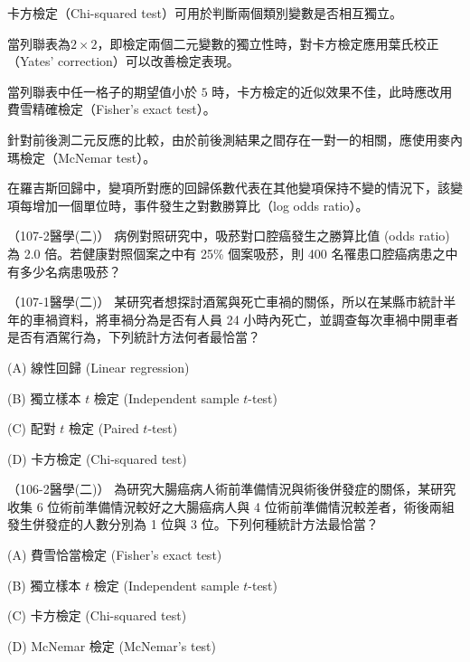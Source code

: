     \answerbox{200pt}

    \begin{takehome}
        \item 卡方檢定（Chi-squared test）可用於判斷兩個類別變數是否相互獨立。
        \item 當列聯表為$2 \times 2$，即檢定兩個二元變數的獨立性時，對卡方檢定應用葉氏校正（Yates' correction）可以改善檢定表現。
        \item 當列聯表中任一格子的期望值小於 $5$ 時，卡方檢定的近似效果不佳，此時應改用費雪精確檢定（Fisher's exact test）。
        \item 針對前後測二元反應的比較，由於前後測結果之間存在一對一的相關，應使用麥內瑪檢定（McNemar test）。
        \item 在羅吉斯回歸中，變項所對應的回歸係數代表在其他變項保持不變的情況下，該變項每增加一個單位時，事件發生之對數勝算比（log odds ratio）。
    \end{takehome}
    
    \begin{docexam}{（107-2醫學(二)）}
        病例對照研究中，吸菸對口腔癌發生之勝算比值 (odds ratio) 為 2.0 倍。若健康對照個案之中有 25\% 個案吸菸，則 400 名罹患口腔癌病患之中有多少名病患吸菸？
    \end{docexam}
    
    \begin{docexam}{（107-1醫學(二)）}
        某研究者想探討酒駕與死亡車禍的關係，所以在某縣市統計半年的車禍資料，將車禍分為是否有人員 24 小時內死亡，並調查每次車禍中開車者是否有酒駕行為，下列統計方法何者最恰當？

        (A) 線性回歸 (Linear regression)
        
        (B) 獨立樣本 $t$ 檢定 (Independent sample $t$-test)

        (C) 配對 $t$ 檢定 (Paired $t$-test)
 
        (D) 卡方檢定 (Chi-squared test)
    \end{docexam}
    
    \begin{docexam}{（106-2醫學(二)）}
        為研究大腸癌病人術前準備情況與術後併發症的關係，某研究收集 6 位術前準備情況較好之大腸癌病人與 4 位術前準備情況較差者，術後兩組發生併發症的人數分別為 1 位與 3 位。下列何種統計方法最恰當？

        (A) 費雪恰當檢定 (Fisher's exact test)
        
        (B) 獨立樣本 $t$ 檢定 (Independent sample $t$-test)

        (C) 卡方檢定 (Chi-squared test)
 
        (D) McNemar 檢定 (McNemar's test)
    \end{docexam}
    
